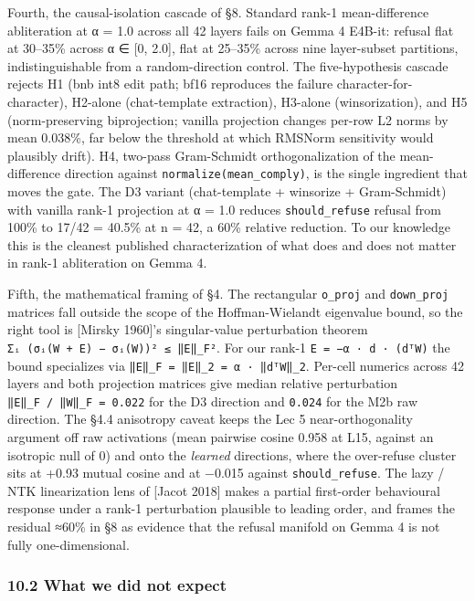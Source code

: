 \documentclass[
  11pt,
]{article}
\begin{document}
Fourth, the causal-isolation cascade of §8. Standard rank-1
mean-difference abliteration at α = 1.0 across all 42 layers fails on
Gemma 4 E4B-it: refusal flat at 30--35\% across α ∈ {[}0, 2.0{]}, flat
at 25--35\% across nine layer-subset partitions, indistinguishable from
a random-direction control. The five-hypothesis cascade rejects H1 (bnb
int8 edit path; bf16 reproduces the failure character-for-character),
H2-alone (chat-template extraction), H3-alone (winsorization), and H5
(norm-preserving biprojection; vanilla projection changes per-row L2
norms by mean 0.038\%, far below the threshold at which RMSNorm
sensitivity would plausibly drift). H4, two-pass Gram-Schmidt
orthogonalization of the mean-difference direction against
\texttt{normalize(mean\_comply)}, is the single ingredient that moves
the gate. The D3 variant (chat-template + winsorize + Gram-Schmidt) with
vanilla rank-1 projection at α = 1.0 reduces \texttt{should\_refuse}
refusal from 100\% to 17/42 = 40.5\% at n = 42, a 60\% relative
reduction. To our knowledge this is the cleanest published
characterization of what does and does not matter in rank-1 abliteration
on Gemma 4.

Fifth, the mathematical framing of §4. The rectangular \texttt{o\_proj}
and \texttt{down\_proj} matrices fall outside the scope of the
Hoffman-Wielandt eigenvalue bound, so the right tool is {[}Mirsky
1960{]}'s singular-value perturbation theorem
\texttt{Σᵢ\ (σᵢ(W\ +\ E)\ −\ σᵢ(W))²\ ≤\ ‖E‖\_F²}. For our rank-1
\texttt{E\ =\ −α\ ·\ d\ ·\ (dᵀW)} the bound specializes via
\texttt{‖E‖\_F\ =\ ‖E‖\_2\ =\ \textbar{}α\textbar{}\ ·\ ‖dᵀW‖\_2}.
Per-cell numerics across 42 layers and both projection matrices give
median relative perturbation \texttt{‖E‖\_F\ /\ ‖W‖\_F\ =\ 0.022} for
the D3 direction and \texttt{0.024} for the M2b raw direction. The §4.4
anisotropy caveat keeps the Lec 5 near-orthogonality argument off raw
activations (mean pairwise cosine 0.958 at L15, against an isotropic
null of 0) and onto the \emph{learned} directions, where the over-refuse
cluster sits at +0.93 mutual cosine and at −0.015 against
\texttt{should\_refuse}. The lazy / NTK linearization lens of {[}Jacot
2018{]} makes a partial first-order behavioural response under a rank-1
perturbation plausible to leading order, and frames the residual ≈60\%
in §8 as evidence that the refusal manifold on Gemma 4 is not fully
one-dimensional.

\subsubsection{10.2 What we did not
expect}\label{what-we-did-not-expect}
\end{document}
